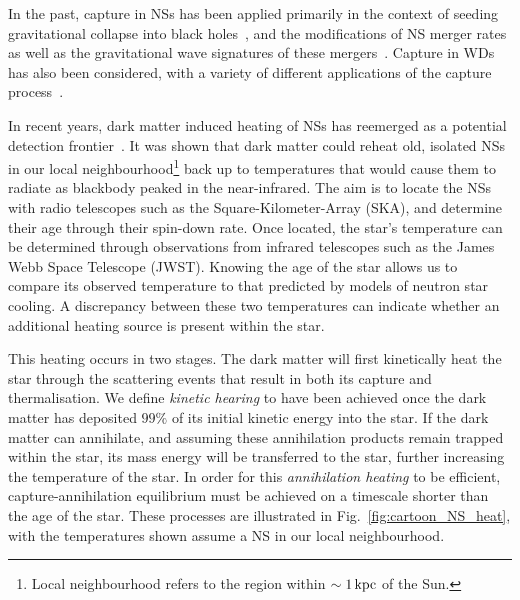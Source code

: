 In the past, capture in NSs has been applied primarily in the context of seeding gravitational collapse into black holes~\cite{McDermott:2011jp_ConstraintsScalarAsymmetric,Kouvaris:2011fi_ExcludingLightAsymmetric,Guver:2012ba_may_Capturedarkmatter, Garani:2018kkd_may_NewAnalysisNeutron,Bramante:2013nma_jan_Boundsselfinteractingfermion,Bertoni:2013bsa_dec_DarkMatterThermalization,Bell:2013xk_jun_Realisticneutronstar}, and the modifications of NS merger rates as well as the gravitational wave signatures of these mergers~\cite{Bramante:2017ulk_mar_SearchingDarkMatter, Ellis:2017jgp_jun_SearchDarkMatter, Ellis:2018bkr_jun_DarkMatterEffects,Nelson:2018xtr_jul_Darkhalosneutron}. Capture in WDs has also been considered, with a variety of different applications of the capture process~\cite{Steigerwald:2019efv_dec_DarkMatterThermonuclear, Panotopoulos:2020kuo_jun_Constraintslightdark, McCullough:2010ai_CaptureInelasticDark, Hooper:2010es_InelasticDarkMatter, Bramante:2015cua_sep_Darkmatterignition, Bertone:2007ae_CompactStarsDark}. 

In recent years, dark matter induced heating of NSs has reemerged as a potential detection frontier~\cite{Raj:2017wrv_feb_Neutronstarsdark, Baryakhtar:2017dbj_sep_DarkKineticHeating, Bell:2018pkk_sep_HeatingNeutronStars,Joglekar:2019vzy_sep_Relativisticcapturedark, Acevedo:2019agu_mar_WarmingNuclearPasta, Bell:2019pyc_jun_CaptureLeptophilicDark, Garani:2019fpa_aug_Darkmatterinteractions,Chatterjee:2022dhp_jul_Faintlightold}. It was shown that dark matter could reheat old, isolated NSs in our local neighbourhood\footnote{Local neighbourhood refers to the region within $\sim 1{\rm \,kpc}$ of the Sun.} back up to temperatures that would cause them to radiate as blackbody peaked in the near-infrared. 
The aim is to locate the NSs with radio telescopes such as the Square-Kilometer-Array (SKA), and determine their age through their spin-down rate. 
Once located, the star's temperature can be determined through observations from infrared telescopes such as the James Webb Space Telescope (JWST). Knowing the age of the star allows us to compare its observed temperature to that predicted by models of neutron star cooling. A discrepancy between these two temperatures can indicate whether an additional heating source is present within the star. 

This heating occurs in two stages. The dark matter will first kinetically heat the star through the scattering events that result in both its capture and thermalisation. We define \textit{kinetic hearing} to have been achieved once the dark matter has deposited $99\%$ of its initial kinetic energy into the star.
If the dark matter can annihilate, and assuming these annihilation products remain trapped within the star, its mass energy will be transferred to the star, further increasing the temperature of the star. In order for this \textit{annihilation heating} to be efficient, capture-annihilation equilibrium must be achieved on a timescale shorter than the age of the star. These processes are illustrated in Fig.~\ref{fig:cartoon_NS_heat}, with the temperatures shown assume a NS in our local neighbourhood.


